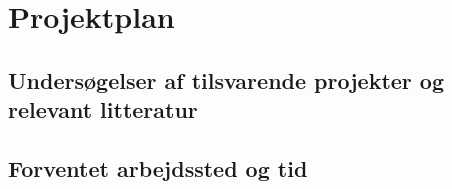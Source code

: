 \documentclass[Main]{subfiles}
\begin{document}
\chapter{Projektplan}


\section{Undersøgelser af tilsvarende projekter og relevant litteratur}


\section{Forventet arbejdssted og tid}
\end{document}
